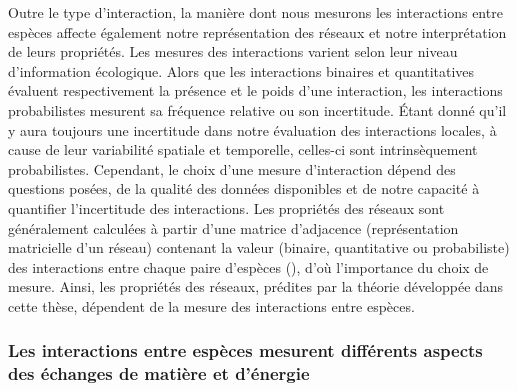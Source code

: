 Outre le type d'interaction, la manière dont nous mesurons les interactions
entre espèces affecte également notre représentation des réseaux et notre
interprétation de leurs propriétés. Les mesures des interactions varient selon
leur niveau d'information écologique. Alors que les interactions binaires et
quantitatives évaluent respectivement la présence et le poids d'une interaction,
les interactions probabilistes mesurent sa fréquence relative ou son
incertitude. Étant donné qu'il y aura toujours une incertitude dans notre
évaluation des interactions locales, à cause de leur variabilité spatiale et
temporelle, celles-ci sont intrinsèquement probabilistes. Cependant, le choix
d'une mesure d'interaction dépend des questions posées, de la qualité des
données disponibles et de notre capacité à quantifier l'incertitude des
interactions. Les propriétés des réseaux sont généralement calculées à partir
d'une matrice d'adjacence (représentation matricielle d'un réseau) contenant la
valeur (binaire, quantitative ou probabiliste) des interactions entre chaque
paire d'espèces (\cite{Delmas2019Analysing}), d'où l'importance du choix de
mesure. Ainsi, les propriétés des réseaux, prédites par la théorie développée
dans cette thèse, dépendent de la mesure des interactions entre espèces. 

\subsubsection{Les interactions entre espèces mesurent différents aspects des échanges de matière et d'énergie} 

